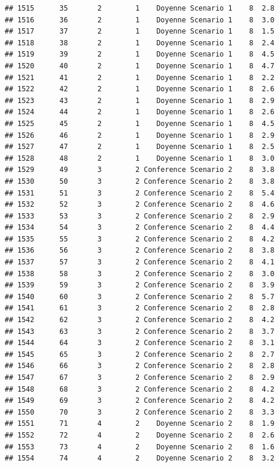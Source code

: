 \documentclass[
]{article}
\begin{document}
\begin{verbatim}
## 1515      35       2        1    Doyenne Scenario 1    8  2.8
## 1516      36       2        1    Doyenne Scenario 1    8  3.0
## 1517      37       2        1    Doyenne Scenario 1    8  1.5
## 1518      38       2        1    Doyenne Scenario 1    8  2.4
## 1519      39       2        1    Doyenne Scenario 1    8  4.5
## 1520      40       2        1    Doyenne Scenario 1    8  4.7
## 1521      41       2        1    Doyenne Scenario 1    8  2.2
## 1522      42       2        1    Doyenne Scenario 1    8  2.6
## 1523      43       2        1    Doyenne Scenario 1    8  2.9
## 1524      44       2        1    Doyenne Scenario 1    8  2.6
## 1525      45       2        1    Doyenne Scenario 1    8  4.5
## 1526      46       2        1    Doyenne Scenario 1    8  2.9
## 1527      47       2        1    Doyenne Scenario 1    8  2.5
## 1528      48       2        1    Doyenne Scenario 1    8  3.0
## 1529      49       3        2 Conference Scenario 2    8  3.8
## 1530      50       3        2 Conference Scenario 2    8  3.8
## 1531      51       3        2 Conference Scenario 2    8  5.4
## 1532      52       3        2 Conference Scenario 2    8  4.6
## 1533      53       3        2 Conference Scenario 2    8  2.9
## 1534      54       3        2 Conference Scenario 2    8  4.4
## 1535      55       3        2 Conference Scenario 2    8  4.2
## 1536      56       3        2 Conference Scenario 2    8  3.8
## 1537      57       3        2 Conference Scenario 2    8  4.1
## 1538      58       3        2 Conference Scenario 2    8  3.0
## 1539      59       3        2 Conference Scenario 2    8  3.9
## 1540      60       3        2 Conference Scenario 2    8  5.7
## 1541      61       3        2 Conference Scenario 2    8  2.8
## 1542      62       3        2 Conference Scenario 2    8  4.2
## 1543      63       3        2 Conference Scenario 2    8  3.7
## 1544      64       3        2 Conference Scenario 2    8  3.1
## 1545      65       3        2 Conference Scenario 2    8  2.7
## 1546      66       3        2 Conference Scenario 2    8  2.8
## 1547      67       3        2 Conference Scenario 2    8  2.9
## 1548      68       3        2 Conference Scenario 2    8  4.2
## 1549      69       3        2 Conference Scenario 2    8  4.2
## 1550      70       3        2 Conference Scenario 2    8  3.3
## 1551      71       4        2    Doyenne Scenario 2    8  1.9
## 1552      72       4        2    Doyenne Scenario 2    8  2.6
## 1553      73       4        2    Doyenne Scenario 2    8  1.6
## 1554      74       4        2    Doyenne Scenario 2    8  3.2

\end{verbatim}
\end{document}
